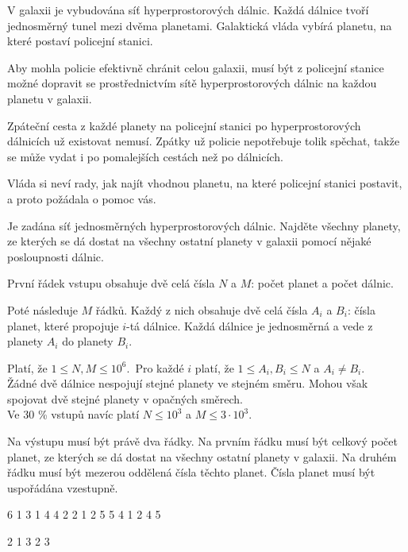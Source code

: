 





V galaxii je vybudována síť hyperprostorových dálnic. Každá dálnice tvoří
jednosměrný tunel mezi dvěma planetami. Galaktická vláda vybírá planetu, na
které postaví policejní stanici.

Aby mohla policie efektivně chránit celou galaxii, musí být z policejní stanice
možné dopravit se prostřednictvím sítě hyperprostorových dálnic na každou
planetu v galaxii.

Zpáteční cesta z každé planety na policejní stanici po hyperprostorových
dálnicích už existovat nemusí. Zpátky už policie nepotřebuje tolik spěchat,
takže se může vydat i po pomalejších cestách než po dálnicích.

Vláda si neví rady, jak najít vhodnou planetu, na které policejní stanici
postavit, a proto požádala o pomoc vás.


Je zadána síť jednosměrných hyperprostorových dálnic. Najděte všechny planety,
ze kterých se dá dostat na všechny ostatní planety v galaxii pomocí nějaké
posloupnosti dálnic.


První řádek vstupu obsahuje dvě celá čísla $N$ a $M$: počet planet a počet
dálnic.

Poté následuje $M$ řádků. Každý z nich obsahuje dvě celá čísla $A_i$ a $B_i$:
čísla planet, které propojuje $i$-tá dálnice. Každá dálnice je jednosměrná a
vede z planety $A_i$ do planety $B_i$.

\bigskip
\noindent
Platí, že $1 \leq N, M \leq 10^6$.\
Pro každé $i$ platí, že $1 \leq A_i, B_i \leq N$ a $A_i \neq B_i$.\\
Žádné dvě dálnice nespojují stejné planety ve stejném směru. Mohou však spojovat
  dvě stejné planety v opačných směrech.\\
Ve 30 \% vstupů navíc platí $N \leq 10^3$ a $M \leq 3 \cdot 10^3$.


Na výstupu musí být právě dva řádky. Na prvním řádku musí být celkový počet
planet, ze kterých se dá dostat na všechny ostatní planety v galaxii. Na druhém
řádku musí být mezerou oddělená čísla těchto planet. Čísla planet musí být
uspořádána vzestupně.


 6
1 3
1 4
4 2
2 1
2 5
5 4
1 2 4 5
\sampleEND

 2
1 3
2 3
~
\sampleEND


